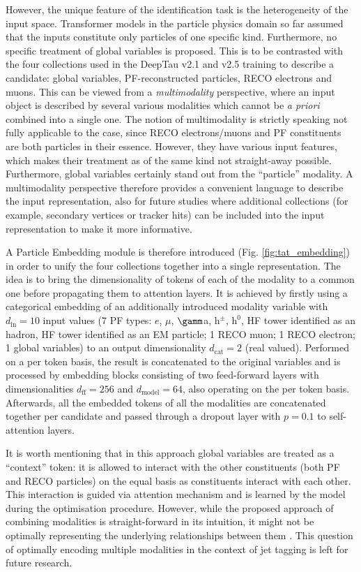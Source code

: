 However, the unique feature of the \tauh identification task is the heterogeneity of the input space. Transformer models in the particle physics domain so far assumed that the inputs constitute only particles of one specific kind. Furthermore, no specific treatment of global variables is proposed. This is to be contrasted with the four collections used in the DeepTau v2.1 and v2.5 training to describe a \tauh candidate: global variables, PF-reconstructed particles, RECO electrons and muons. This can be viewed from a \textit{multimodality} perspective, where an input object is described by several various modalities which cannot be \textit{a priori} combined into a single one. The notion of multimodality is strictly speaking not fully applicable to the \tauh case, since RECO electrons/muons and PF constituents are both particles in their essence. However, they have various input features, which makes their treatment as of the same kind not straight-away possible. Furthermore, global variables certainly stand out from the \enquote{particle} modality. A multimodality perspective therefore provides a convenient language to describe the input \tauh representation, also for future studies where additional collections (for example, secondary vertices or tracker hits) can be included into the input representation to make it more informative.  

A Particle Embedding module is therefore introduced (Fig. \ref{fig:tat_embedding}) in order to unify the four collections together into a single representation. The idea is to bring the dimensionality of tokens of each of the modality to a common one before propagating them to attention layers. It is achieved by firstly using a categorical embedding of an additionally introduced modality variable with $d_\text{in}=10$ input values (7 PF types: $e$, $\mu$, $\gamm$a, $\text{h}^\pm$, $\text{h}^0$, HF tower identified as an hadron, HF tower identified as an EM particle; 1 RECO muon; 1 RECO electron; 1 global variables) to an output dimensionality $d_\text{cat}=2$ (real valued). Performed on a per token basis, the result is concatenated to the original variables and is processed by embedding blocks consisting of two feed-forward layers with dimensionalities $d_\text{ff}=256$ and $d_\text{model}=64$, also operating on the per token basis. Afterwards, all the embedded tokens of all the modalities are concatenated together per \tauh candidate and passed through a dropout layer with $p=0.1$ to self-attention layers.

It is worth mentioning that in this approach global variables are treated as a \enquote{context} token: it is allowed to interact with the other constituents (both PF and RECO particles) on the equal basis as constituents interact with each other. This interaction is guided via attention mechanism and is learned by the model during the optimisation procedure. However, while the proposed approach of combining modalities is straight-forward in its intuition, it might not be optimally representing the underlying relationships between them \cite{xu2022multimodal}. This question of optimally encoding multiple modalities in the context of jet tagging is left for future research.   


